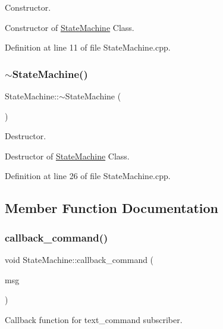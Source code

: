 Constructor. 

Constructor of \hyperlink{class_state_machine}{State\+Machine} Class. 

Definition at line 11 of file State\+Machine.\+cpp.

\mbox{\label{class_state_machine_a93d66cb2a89b186789d655a08b02674e}} 
\subsubsection{\texorpdfstring{$\sim$\+State\+Machine()}{~StateMachine()}}
{\footnotesize\ttfamily State\+Machine\+::$\sim$\+State\+Machine (\begin{DoxyParamCaption}{ }\end{DoxyParamCaption})}



Destructor. 

Destructor of \hyperlink{class_state_machine}{State\+Machine} Class. 

Definition at line 26 of file State\+Machine.\+cpp.



\subsection{Member Function Documentation}
\mbox{\label{class_state_machine_a0d90a952683cb15f30bfbaea63ff2e10}} 
\subsubsection{\texorpdfstring{callback\+\_\+command()}{callback\_command()}}
{\footnotesize\ttfamily void State\+Machine\+::callback\+\_\+command (\begin{DoxyParamCaption}\item[{const labeled\+\_\+slam\+::\+Command\+::\+Const\+Ptr \&}]{msg }\end{DoxyParamCaption})}



Callback function for text\+\_\+command subscriber. 

